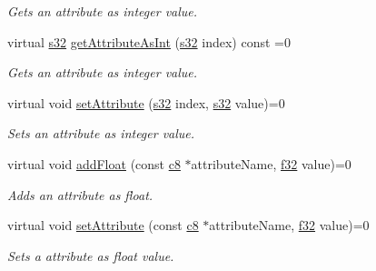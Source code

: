 \begin{DoxyCompactItemize}
\begin{DoxyCompactList}\small\item\em Gets an attribute as integer value. \end{DoxyCompactList}\item 
virtual \hyperlink{namespaceirr_ac66849b7a6ed16e30ebede579f9b47c6}{s32} \hyperlink{classirr_1_1io_1_1IAttributes_a71aab77245c8cfc02b547d1031548006}{get\+Attribute\+As\+Int} (\hyperlink{namespaceirr_ac66849b7a6ed16e30ebede579f9b47c6}{s32} index) const =0
\begin{DoxyCompactList}\small\item\em Gets an attribute as integer value. \end{DoxyCompactList}\item 
\mbox{\label{classirr_1_1io_1_1IAttributes_aab68bfaf76afb61799ab0b6bc2d66cd7}} 
virtual void \hyperlink{classirr_1_1io_1_1IAttributes_aab68bfaf76afb61799ab0b6bc2d66cd7}{set\+Attribute} (\hyperlink{namespaceirr_ac66849b7a6ed16e30ebede579f9b47c6}{s32} index, \hyperlink{namespaceirr_ac66849b7a6ed16e30ebede579f9b47c6}{s32} value)=0
\begin{DoxyCompactList}\small\item\em Sets an attribute as integer value. \end{DoxyCompactList}\item 
\mbox{\label{classirr_1_1io_1_1IAttributes_a8e3add73bd9daba6f6e614361c659930}} 
virtual void \hyperlink{classirr_1_1io_1_1IAttributes_a8e3add73bd9daba6f6e614361c659930}{add\+Float} (const \hyperlink{namespaceirr_a9395eaea339bcb546b319e9c96bf7410}{c8} $\ast$attribute\+Name, \hyperlink{namespaceirr_a0277be98d67dc26ff93b1a6a1d086b07}{f32} value)=0
\begin{DoxyCompactList}\small\item\em Adds an attribute as float. \end{DoxyCompactList}\item 
\mbox{\label{classirr_1_1io_1_1IAttributes_ab6f77e30a926a509847439b345537aaf}} 
virtual void \hyperlink{classirr_1_1io_1_1IAttributes_ab6f77e30a926a509847439b345537aaf}{set\+Attribute} (const \hyperlink{namespaceirr_a9395eaea339bcb546b319e9c96bf7410}{c8} $\ast$attribute\+Name, \hyperlink{namespaceirr_a0277be98d67dc26ff93b1a6a1d086b07}{f32} value)=0
\begin{DoxyCompactList}\small\item\em Sets a attribute as float value. \end{DoxyCompactList}\item 

\end{DoxyCompactItemize}

